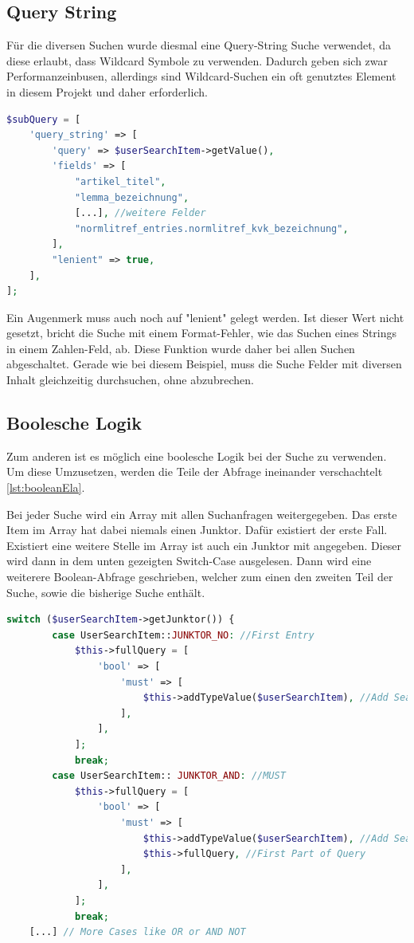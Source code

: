 \subsection{Query String}
Für die diversen Suchen wurde diesmal eine Query-String Suche verwendet, da diese erlaubt, dass Wildcard Symbole zu verwenden. Dadurch geben sich zwar Performanzeinbusen, allerdings sind Wildcard-Suchen ein oft genutztes Element in diesem Projekt und daher erforderlich.

\begin{lstlisting}[language=PHP, frame=single, label={lst:aufbauQueryString}] 
$subQuery = [
    'query_string' => [
        'query' => $userSearchItem->getValue(),
        'fields' => [
            "artikel_titel",
            "lemma_bezeichnung",
            [...], //weitere Felder
            "normlitref_entries.normlitref_kvk_bezeichnung",
        ],
        "lenient" => true,
    ],
];
\end{lstlisting}

Ein Augenmerk muss auch noch auf "lenient" gelegt werden. Ist dieser Wert nicht gesetzt, bricht die Suche mit einem Format-Fehler, wie das Suchen eines Strings in einem Zahlen-Feld, ab. Diese Funktion wurde daher bei allen Suchen abgeschaltet. Gerade wie bei diesem Beispiel, muss die Suche Felder mit diversen Inhalt gleichzeitig durchsuchen, ohne abzubrechen. 

\subsection{Boolesche Logik}

Zum anderen ist es möglich eine boolesche Logik bei der Suche zu verwenden. Um diese Umzusetzen, werden die Teile der Abfrage ineinander verschachtelt \ref{lst:booleanEla}. 

Bei jeder Suche wird ein Array mit allen Suchanfragen weitergegeben. Das erste Item im Array hat dabei niemals einen Junktor. Dafür existiert der erste Fall. Existiert eine weitere Stelle im Array ist auch ein Junktor mit angegeben. Dieser wird dann in dem unten gezeigten Switch-Case ausgelesen. Dann wird eine weiterere Boolean-Abfrage geschrieben, welcher zum einen den zweiten Teil der Suche, sowie die bisherige Suche enthält.

\begin{lstlisting}[language=PHP, frame=single, label={lst:booleanEla}] 
    switch ($userSearchItem->getJunktor()) {
        case UserSearchItem::JUNKTOR_NO: //First Entry
            $this->fullQuery = [
                'bool' => [
                    'must' => [
                        $this->addTypeValue($userSearchItem), //Add Search
                    ],
                ],
            ];
            break;
        case UserSearchItem:: JUNKTOR_AND: //MUST
            $this->fullQuery = [
                'bool' => [
                    'must' => [
                        $this->addTypeValue($userSearchItem), //Add Search
                        $this->fullQuery, //First Part of Query
                    ],
                ],
            ];
            break;
    [...] // More Cases like OR or AND NOT
\end{lstlisting}

